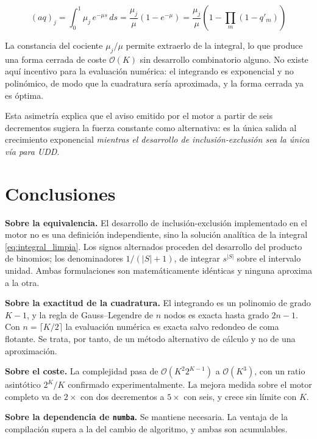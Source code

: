 \documentclass[a4paper, 12pt]{article}
\begin{document}
\begin{equation}
(aq)_j = \int_0^1 \mu_j\, e^{-\mu s}\, ds = \frac{\mu_j}{\mu}\left(1 - e^{-\mu}\right) = \frac{\mu_j}{\mu}\left(1 - \prod_m (1-q'_m)\right)
\end{equation}

La constancia del cociente $\mu_j/\mu$ permite extraerlo de la integral, lo que produce una forma cerrada de coste $\mathcal{O}(K)$ sin desarrollo combinatorio alguno. No existe aquí incentivo para la evaluación numérica: el integrando es exponencial y no polinómico, de modo que la cuadratura sería aproximada, y la forma cerrada ya es óptima.

Esta asimetría explica que el aviso emitido por el motor a partir de seis decrementos sugiera la fuerza constante como alternativa: es la única salida al crecimiento exponencial \emph{mientras el desarrollo de inclusión-exclusión sea la única vía para UDD}.

\newpage

\section{Conclusiones}

\textbf{Sobre la equivalencia.} El desarrollo de inclusión-exclusión implementado en el motor no es una definición independiente, sino la solución analítica de la integral \eqref{eq:integral_limpia}. Los signos alternados proceden del desarrollo del producto de binomios; los denominadores $1/(|S|+1)$, de integrar $s^{|S|}$ sobre el intervalo unidad. Ambas formulaciones son matemáticamente idénticas y ninguna aproxima a la otra.

\textbf{Sobre la exactitud de la cuadratura.} El integrando es un polinomio de grado $K-1$, y la regla de Gauss--Legendre de $n$ nodos es exacta hasta grado $2n-1$. Con $n = \lceil K/2 \rceil$ la evaluación numérica es exacta salvo redondeo de coma flotante. Se trata, por tanto, de un método alternativo de cálculo y no de una aproximación.

\textbf{Sobre el coste.} La complejidad pasa de $\mathcal{O}(K^2 2^{K-1})$ a $\mathcal{O}(K^3)$, con un ratio asintótico $2^K/K$ confirmado experimentalmente. La mejora medida sobre el motor completo va de $2\times$ con dos decrementos a $5\times$ con seis, y crece sin límite con $K$.

\textbf{Sobre la dependencia de \texttt{numba}.} Se mantiene necesaria. La ventaja de la compilación supera a la del cambio de algoritmo, y ambas son acumulables.
\end{document}
